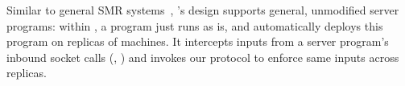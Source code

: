 Similar to general SMR systems~\cite{rex:eurosys14,crane:sosp15}, 
\xxx's design supports general, unmodified server programs: within \xxx, a 
program just runs as is, and \xxx automatically deploys this program on replicas 
of machines. It intercepts inputs from a server program's inbound socket calls 
(\eg, \recv) and invokes our \paxos protocol to enforce same inputs 
across replicas.






% 



